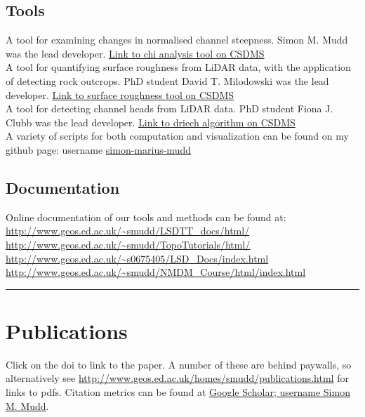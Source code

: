 \documentclass[10pt, a4paper]{article}
\newcommand{\years}[1]{\marginnote{\scriptsize #1}}
\begin{document}
\subsection*{Tools}
\years{CSDMS}A tool for examining changes in normalised channel steepness. Simon M. Mudd was the lead developer. \href{http://csdms.colorado.edu/wiki/Model:Chi_analysis_tools}{Link to chi analysis tool on CSDMS}\\[0.05cm]
A tool for quantifying surface roughness from LiDAR data, with the application of detecting rock outcrops. PhD student David T. Milodowski was the lead developer. \href{http://csdms.colorado.edu/wiki/Model:SurfaceRoughness}{Link to surface roughness tool on CSDMS}\\[0.05cm]
A tool for detecting channel heads from LiDAR data. PhD student Fiona J. Clubb was the lead developer. \href{http://csdms.colorado.edu/wiki/Model:DrEICH_algorithm}{Link to driech algorithm on CSDMS}\\[0.05cm]

\years{Github}A variety of scripts for both computation and visualization can be found on my github page: username \href{https://github.com/simon-m-mudd}{simon-marius-mudd}

\subsection*{Documentation}Online documentation of our tools and methods can be found at:\\[0.05cm]
\url{http://www.geos.ed.ac.uk/~smudd/LSDTT_docs/html/}\\[0.05cm]
\url{http://www.geos.ed.ac.uk/~smudd/TopoTutorials/html/}\\[0.05cm]
\url{http://www.geos.ed.ac.uk/~s0675405/LSD_Docs/index.html}\\[0.05cm]
\url{http://www.geos.ed.ac.uk/~smudd/NMDM_Course/html/index.html}\\[0.05cm]

\hrule
\section*{Publications}
Click on the doi to link to the paper. A number of these are behind paywalls, so alternatively see \href{http://www.geos.ed.ac.uk/homes/smudd/publications.html}{http://www.geos.ed.ac.uk/homes/smudd/publications.html} for links to pdfs. Citation metrics can be found at \href{http://scholar.google.com/citations?user=9iv6l7wAAAAJ\&hl=en}{Google Scholar; username Simon M. Mudd}. 
\end{document}
